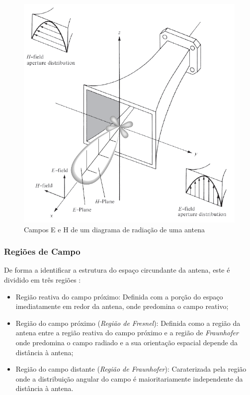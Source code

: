 \begin{figure}[h]
\centering
\includegraphics[scale=0.6]{chapters/ch3/assets/campoEH_piramidal}
\decoRule
\caption[Campos E e H de um diagrama de radiação de uma antena]{Campos E e H de um diagrama de radiação de uma antena}
\label{fig:campoEH_piramidal}
\end{figure}

\subsubsection*{Regiões de Campo}
De forma a identificar a estrutura do espaço circundante da antena, este é dividido em três regiões \parencite{Kraus1988}:
\begin{itemize}
\item Região reativa do campo próximo: Definida com a porção do espaço imediatamente em redor da antena, onde predomina o campo reativo;
\item Região do campo próximo (\textit{Região de Fresnel}): Definida como a região da antena entre a região reativa do campo próximo e a região de \textit{Fraunhofer} onde predomina o campo radiado e a sua orientação espacial depende da distância à antena;
\item Região do campo distante (\textit{Região de Fraunhofer}): Caraterizada pela região onde a distribuição angular do campo é maioritariamente independente da distância à antena.
\end{itemize}


